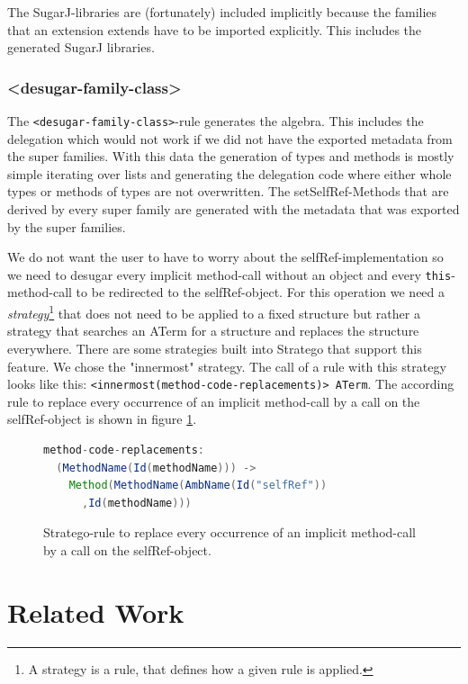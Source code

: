 \documentclass{report}
\begin{document}
The SugarJ-libraries are (fortunately) included implicitly because the families that an extension extends have to be imported explicitly. This includes the generated SugarJ libraries.

\subsubsection{\textless{}desugar-family-class\textgreater}
The \lstinline{<desugar-family-class>}-rule generates the algebra. This includes the delegation which would not work if we did not have the exported metadata from the super families. With this data the generation of types and methods is mostly simple iterating over lists and generating the delegation code where either whole types or methods of types are not overwritten. The setSelfRef-Methods that are derived by every super family are generated with the metadata that was exported by the super families.

We do not want the user to have to worry about the selfRef-implementation so we need to desugar every implicit method-call without an object and every \lstinline{this}-method-call to be redirected to the selfRef-object. For this operation we need a \emph{strategy}\footnote{A strategy is a rule, that defines how a given rule is applied.} that does not need to be applied to a fixed structure but rather a strategy that searches an ATerm for a structure and replaces the structure everywhere. There are some strategies built into Stratego that support this feature. We chose the "innermost" strategy. The call of a rule with this strategy looks like this: \lstinline{<innermost(method-code-replacements)> ATerm}. The according rule to replace every occurrence of an implicit method-call by a call on the selfRef-object is shown in figure \ref{replaceMethodBySelfRef}.

\begin{figure}[H]
\begin{lstlisting}[language=java,breaklines=false,morekeywords={familyname,super,familyClasses},keywordstyle=\bfseries\color{OliveGreen}]
method-code-replacements:
  (MethodName(Id(methodName))) ->
    Method(MethodName(AmbName(Id("selfRef"))
      ,Id(methodName)))
\end{lstlisting}
\caption{Stratego-rule to replace every occurrence of an implicit method-call by a call on the selfRef-object.}
\label{replaceMethodBySelfRef}
\end{figure}

\section{Related Work}
\end{document}
